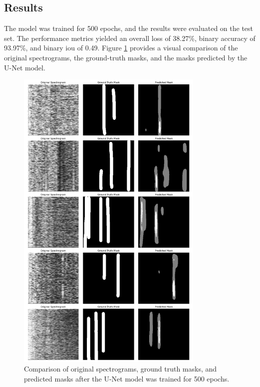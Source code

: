 \subsection{Results}

The model was trained for 500 epochs, and the results were evaluated on the test set. The performance metrics yielded an overall loss of 38.27\%, binary accuracy of 93.97\%, and binary \acrshort{iou} of 0.49. Figure \ref{fig:unet-segmentation-results} provides a visual comparison of the original spectrograms, the ground-truth masks, and the masks predicted by the U-Net model.

\begin{figure}[p]
    \centering
    \includegraphics[width=0.8\textwidth]{img/ch6/masking/unet_segmentation_500_epochs.png}
    \caption{Comparison of original spectrograms, ground truth masks, and predicted masks after the U-Net model was trained for 500 epochs.}
    \label{fig:unet-segmentation-results}
\end{figure}

